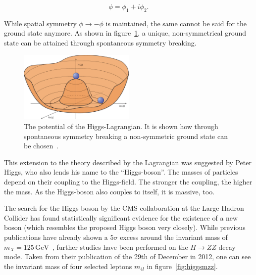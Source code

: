 \begin{equation}
  \label{eq:higgsimfield}
  \phi = \phi_1 + i \phi_2.
\end{equation}

\noindent While spatial symmetry $\phi \rightarrow - \phi$ is maintained, the same cannot be said for the ground state anymore. As shown in figure~\ref{fig:higgspotential}, a unique, non-symmetrical ground state can be attained through spontaneous symmetry breaking.

\begin{figure}[ht!]
  \centering
    \includegraphics[width=0.5\textwidth]{plots/higgspotential.jpg}
  \caption{The potential of the Higgs-Lagrangian. It is shown how through spontaneous symmetry breaking a non-symmetric ground state can be chosen~\cite{higgspotential}.}
  \label{fig:higgspotential}
\end{figure}


This extension to the theory described by the Lagrangian was suggested by Peter Higgs, who also lends his name to the ``Higgs-boson''. The masses of particles depend on their coupling to the Higgs-field. The stronger the coupling, the higher the mass. As the Higgs-boson also couples to itself, it is massive, too.

The search for the Higgs boson by the CMS collaboration at the Large Hadron Collider has found statistically significant evidence for the existence of a new boson (which resembles the proposed Higgs boson very closely). While previous publications have already shown a $5 \sigma$ excess around the invariant mass of $m_X = 125\,\text{GeV}$~\cite{higgscls}, further studies have been performed on the $H \rightarrow ZZ$ decay mode. Taken from their publication of the 29th of December in 2012, one can see the invariant mass of four selected leptons $m_{4 l}$ in figure~\ref{fig:higgsmzz}.

